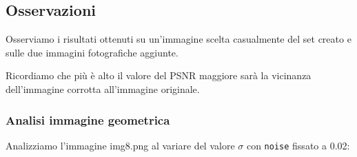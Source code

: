 {\color{bblue}\subsection{Osservazioni}}
Osserviamo i risultati ottenuti su un'immagine scelta casualmente del set creato e sulle due immagini 
 fotografiche aggiunte.

Ricordiamo che più è alto il valore del PSNR maggiore sarà la vicinanza dell'immagine corrotta 
all'immagine originale. 

{\color{bblue}\subsubsection{Analisi immagine geometrica}}
Analizziamo l'immagine img8.png al variare del valore $\sigma$ con \verb|noise| fissato a 0.02:

